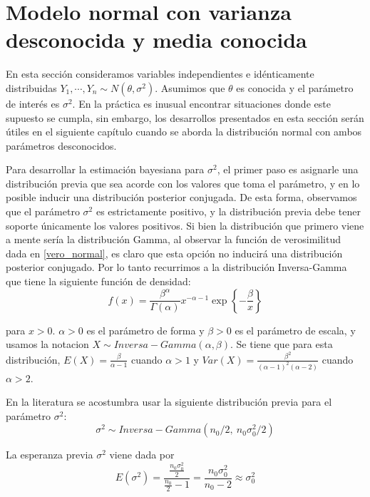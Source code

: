     \section{Modelo normal con varianza desconocida y media conocida}\label{Normal_Varianza}
    
    En esta secci\'on consideramos variables independientes e id\'enticamente distribuidas $Y_1,\cdots,Y_n\sim N(\theta,\sigma^2)$. Asumimos que $\theta$ es conocida y el par\'ametro de inter\'es es $\sigma^2$. En la pr\'actica es inusual encontrar situaciones donde este supuesto se cumpla, sin embargo, los desarrollos presentados en esta secci\'on ser\'an \'utiles en el siguiente cap\'itulo cuando se aborda la distribuci\'on normal con ambos par\'ametros desconocidos. 
    
    Para desarrollar la estimaci\'on bayesiana para $\sigma^2$, el primer paso es asignarle una distribuci\'on previa que sea acorde con los valores que toma el par\'ametro, y en lo posible inducir una distribuci\'on posterior conjugada. De esta forma, observamos que el par\'ametro $\sigma^2$ es estrictamente positivo, y la distribuci\'on previa debe tener soporte \'unicamente los valores positivos. Si bien la distribuci\'on que primero viene a mente ser\'ia la distribuci\'on Gamma, al observar la funci\'on de verosimilitud dada en \ref{vero_normal}, es claro que esta opci\'on no inducir\'a una distribuci\'on posterior conjugado. Por lo tanto recurrimos a la distribuci\'on Inversa-Gamma que tiene la siguiente funci\'on de densidad:
    \begin{equation*}
    f(x)=\dfrac{\beta^\alpha}{\Gamma(\alpha)}x^{-\alpha-1}\exp\left\{-\frac{\beta}{x}\right\}
    \end{equation*}
    
    para $x>0$. $\alpha>0$ es el par\'ametro de forma y $\beta>0$ es el par\'ametro de escala, y usamos la notacion $X\sim Inversa-Gamma(\alpha,\beta)$. Se tiene que para esta distribuci\'on, $E(X)=\frac{\beta}{\alpha-1}$ cuando $\alpha>1$ y $Var(X)=\frac{\beta^2}{(\alpha-1)^2(\alpha-2)}$ cuando $\alpha>2$.
    
    En la literatura se acostumbra usar la siguiente distribuci\'on previa para el par\'ametro $\sigma^2$:
    \begin{equation*}
    \sigma^2 \sim Inversa-Gamma(n_0/2,\ n_0\sigma^2_0/2)
    \end{equation*}
    
    La esperanza previa $\sigma^2$ viene dada por
    \begin{equation*}
    E(\sigma^2)=\dfrac{\frac{n_0\sigma^2_0}{2}}{\frac{n_0}{2}-1}=\dfrac{n_0\sigma^2_0}{n_0-2}\approx\sigma^2_0
    \end{equation*}
    
